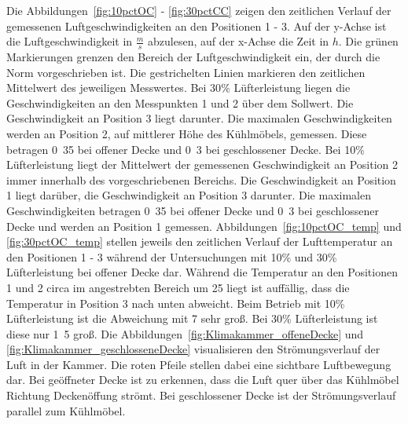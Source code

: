 Die Abbildungen~\ref{fig:10pctOC} - \ref{fig:30pctCC} zeigen den zeitlichen Verlauf der gemessenen Luftgeschwindigkeiten an den Positionen 1 - 3. Auf der y-Achse ist die Luftgeschwindigkeit in $\frac{m}{s}$ abzulesen, auf der x-Achse die Zeit in $h$. Die grünen Markierungen grenzen den Bereich der Luftgeschwindigkeit ein, der durch die Norm vorgeschrieben ist. Die gestrichelten Linien markieren den zeitlichen Mittelwert des jeweiligen Messwertes. \newline
Bei \unit{30}{\%} Lüfterleistung liegen die Geschwindigkeiten an den Messpunkten 1 und 2 über dem Sollwert. Die Geschwindigkeit an Position 3 liegt darunter. Die maximalen Geschwindigkeiten werden an Position 2, auf mittlerer Höhe des Kühlmöbels, gemessen. Diese betragen \unit{0.35}{\metre\per\second} bei offener Decke und \unit{0.3}{\metre\per\second} bei geschlossener Decke. 
Bei \unit{10}{\%} Lüfterleistung liegt der Mittelwert der gemessenen Geschwindigkeit an Position 2 immer innerhalb des vorgeschriebenen Bereichs. Die Geschwindigkeit an Position 1 liegt darüber, die Geschwindigkeit an Position 3 darunter. Die maximalen Geschwindigkeiten betragen \unit{0.35}{\metre\per\second} bei offener Decke und \unit{0.3}{\metre\per\second} bei geschlossener Decke und werden an Position 1 gemessen. \newline
Abbildungen~\ref{fig:10pctOC_temp} und \ref{fig:30pctOC_temp} stellen jeweils den zeitlichen Verlauf der Lufttemperatur an den Positionen 1 - 3 während der Untersuchungen mit \unit{10}{\%} und \unit{30}{\%} Lüfterleistung bei offener Decke dar.
Während die Temperatur an den Positionen 1 und 2 circa im angestrebten Bereich um \unit{25}{\celsius} liegt ist auffällig, dass die Temperatur in Position 3 nach unten abweicht. Beim Betrieb mit \unit{10}{\%} Lüfterleistung ist die Abweichung mit \unit{7}{\kelvin} sehr groß. Bei \unit{30}{\%} Lüfterleistung ist diese nur \unit{1.5}{\kelvin} groß. \newline
Die Abbildungen~\ref{fig:Klimakammer_offeneDecke} und \ref{fig:Klimakammer_geschlosseneDecke} visualisieren den Strömungsverlauf der Luft in der Kammer. Die roten Pfeile stellen dabei eine sichtbare Luftbewegung dar.
Bei geöffneter Decke ist zu erkennen, dass die Luft quer über das Kühlmöbel Richtung Deckenöffung strömt. Bei geschlossener Decke ist der Strömungsverlauf parallel zum Kühlmöbel.




